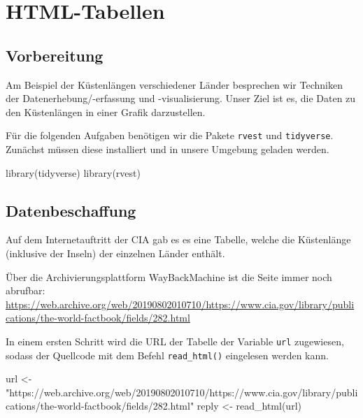 \documentclass[11pt,german,a4paper]{article}
\newenvironment{Shaded}{\begin{snugshade}}{\end{snugshade}}
\newcommand{\FunctionTok}[1]{\textcolor[rgb]{0.00,0.00,0.00}{#1}}
\newcommand{\NormalTok}[1]{#1}
\newcommand{\OtherTok}[1]{\textcolor[rgb]{0.56,0.35,0.01}{#1}}
\newcommand{\StringTok}[1]{\textcolor[rgb]{0.31,0.60,0.02}{#1}}
\begin{document}
\hypertarget{html-tabellen}{%
\section{HTML-Tabellen}\label{html-tabellen}}

\hypertarget{vorbereitung-2}{%
\subsection{Vorbereitung}\label{vorbereitung-2}}

Am Beispiel der Küstenlängen verschiedener Länder besprechen wir Techniken der Datenerhebung/-erfassung und -visualisierung. Unser Ziel ist es, die Daten zu den Küstenlängen in einer Grafik darzustellen.

Für die folgenden Aufgaben benötigen wir die Pakete \texttt{rvest} und \texttt{tidyverse}. Zunächst müssen diese installiert und in unsere Umgebung geladen werden.

\begin{Shaded}
\begin{Highlighting}[]
\FunctionTok{library}\NormalTok{(tidyverse)}
\FunctionTok{library}\NormalTok{(rvest)}
\end{Highlighting}
\end{Shaded}

\hypertarget{datenbeschaffung}{%
\subsection{Datenbeschaffung}\label{datenbeschaffung}}

Auf dem Internetauftritt der CIA gab es es eine Tabelle, welche die Küstenlänge (inklusive der Inseln) der einzelnen Länder enthält.

Über die Archivierungsplattform WayBackMachine ist die Seite immer noch abrufbar: \url{https://web.archive.org/web/20190802010710/https://www.cia.gov/library/publications/the-world-factbook/fields/282.html}

In einem ersten Schritt wird die URL der Tabelle der Variable \texttt{url} zugewiesen, sodass der Quellcode mit dem Befehl \texttt{read\_html()} eingelesen werden kann.

\begin{Shaded}
\begin{Highlighting}[]
\NormalTok{url }\OtherTok{\textless{}{-}} \StringTok{"https://web.archive.org/web/20190802010710/https://www.cia.gov/library/publications/the{-}world{-}factbook/fields/282.html"}
\NormalTok{reply }\OtherTok{\textless{}{-}} \FunctionTok{read\_html}\NormalTok{(url)}
\end{Highlighting}
\end{Shaded}
\end{document}
